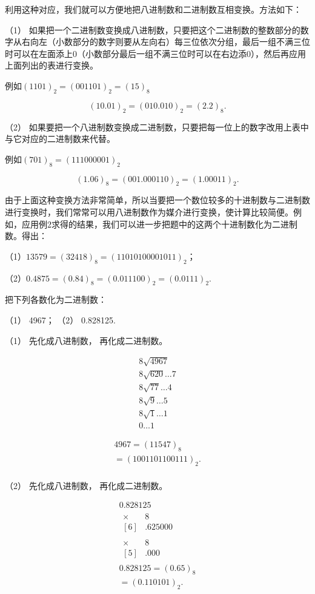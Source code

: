 利用这种对应，我们就可以方便地把八进制数和二进制数互相变换。方法如下：

（1）
如果把一个二进制数变换成八进制数，只要把这个二进制数的整数部分的数字从右向左（小数部分的数字则要从左向右）每三位依次分组，最后一组不满三位时可以在左面添上0（小数部分最后一组不满三位时可以在右边添0），然后再应用上面列出的表进行变换。

例如\((1101)_2 = (001101)_2 = (15)_8\)

\[
(10.01) _{2} = (010.010) _{2} = (2.2) _{8}.
\]

（2）
如果要把一个八进制数变换成二进制数，只要把每一位上的数字改用上表中与它对应的二进制数来代替。

例如\((701)_{8} = (111000001)_{2}\)

\[
(1.06) _{8} = (001.000110) _{2} = (1.00011) _{2}.
\]

由于上面这种变换方法非常简单，所以当要把一个数位较多的十进制数与二进制数进行变换时，我们常常可以用八进制数作为媒介进行变换，使计算比较简便。例如，应用例2求得的结果，我们可以进一步把题中的这两个十进制数化为二进制数。得出：

（1）\(13579 = (32418)_{8} = (11010100001011)_{2}\)；

（2）\(0.4875 = (0.84)_8 = (0.011100)_2 = (0.0111)_2.\)

 把下列各数化为二进制数：

（1） 4967； （2） 0.828125.

 （1） 先化成八进制数， 再化成二进制数。

\[
\begin{array}{r} 8 \sqrt {4967} \\ \hline 8 \sqrt {620} \dots 7 \\ 8 \sqrt {77} \dots 4 \\ 8 \sqrt {9} \dots 5 \\ \hline 8 \sqrt {1} \dots 1 \\ \hline 0 \dots 1 \end{array}
\]

\[
\begin{array}{l} 4967 = (11547) _{8} \\ = (1001101100111) _{2}. \\ \end{array}
\]

（2） 先化成八进制数， 再化成二进制数。

\[
\begin{array}{l} 0.828125 \\ \begin{array}{cc} \times & 8 \\ \hline [ 6 ] & . 625000 \end{array} \\ \begin{array}{cc} \times & 8 \\ \hline [ 5 ] & . 000 \end{array} \\ 0.828125 = (0.65) _{8} \\ = (0.110101) _{2}. \\ \end{array}
\]

